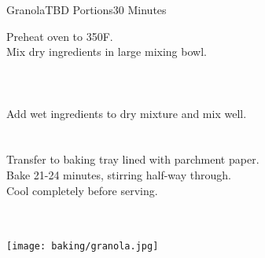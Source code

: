 \begin{recipe}{Granola}{TBD Portions}{30 Minutes}

Preheat oven to 350\degrees F.\\

Mix dry ingredients in large mixing bowl.\\~\\~\\~\\

Add wet ingredients to dry mixture and mix well.\\~\\~\\

\newstep
Transfer to baking tray lined with parchment paper.\\

\newstep
Bake 21-24 minutes, stirring half-way through.\\

\newstep
Cool completely before serving.

\end{recipe}

\begin{center}
~\\~\\
\texttt{[image: baking/granola.jpg]}
\end{center}